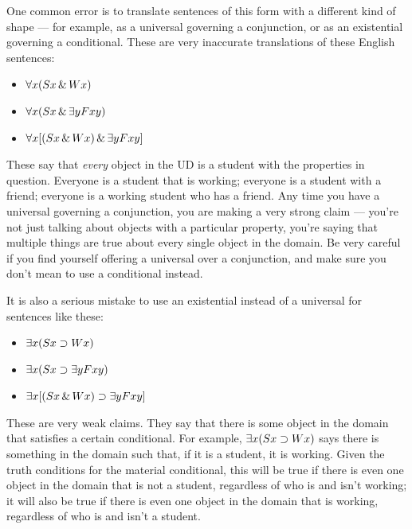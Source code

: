 One common error is to translate sentences of this form with a different kind of shape --- for example, as a universal governing a conjunction, or as an existential governing a conditional. These are very inaccurate translations of these English sentences:

\begin{itemize}
\item $\forall x (Sx \,\&\, Wx)$
\item $\forall x (Sx \,\&\, \exists y Fxy)$
\item $\forall x [(Sx \,\&\, Wx) \,\&\, \exists y Fxy]$
\end{itemize}

These say that \emph{every} object in the UD is a student with the properties in question. Everyone is a student that is working; everyone is a student with a friend; everyone is a working student who has a friend. Any time you have a universal governing a conjunction, you are making a very strong claim --- you're not just talking about objects with a particular property, you're saying that multiple things are true about every single object in the domain. Be very careful if you find yourself offering a universal over a conjunction, and make sure you don't mean to use a conditional instead.

It is also a serious mistake to use an existential instead of a universal for sentences like these:

\begin{itemize}
\item $\exists x (Sx \supset Wx)$
\item $\exists x (Sx \supset \exists y Fxy)$
\item $\exists x [(Sx \,\&\, Wx) \supset \exists y Fxy]$
\end{itemize}

These are very weak claims. They say that there is some object in the domain that satisfies a certain conditional. For example, $\exists x (Sx \supset Wx)$ says there is something in the domain such that, if it is a student, it is working. Given the truth conditions for the material conditional, this will be true if there is even one object in the domain that is not a student, regardless of who is and isn't working; it will also be true if there is even one object in the domain that is working, regardless of who is and isn't a student.


